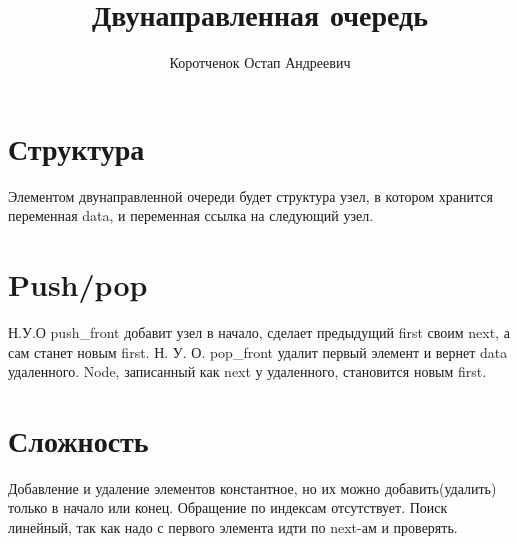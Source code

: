 \documentclass[a4paper,11pt]{report}
\title{Двунаправленная очередь}
\author{Коротченок Остап Андреевич}
\begin{document}
\maketitle
\tableofcontents
\chapter{Структура}
Элементом двунаправленной очереди будет структура узел, в котором хранится переменная data, и переменная ссылка на следующий узел.

\chapter{Push/pop}
Н.У.О push\_front добавит узел в начало, сделает предыдущий first своим next, а сам станет новым first.
Н. У. О. pop\_front удалит первый элемент и вернет data удаленного. Node, записанный как next у удаленного, становится новым first.
\chapter{Сложность}
Добавление и удаление элементов константное, но их можно добавить(удалить) только в начало или конец. Обращение по индексам отсутствует. Поиск линейный, так как надо с первого элемента идти по next-ам и проверять.
\end{document}
